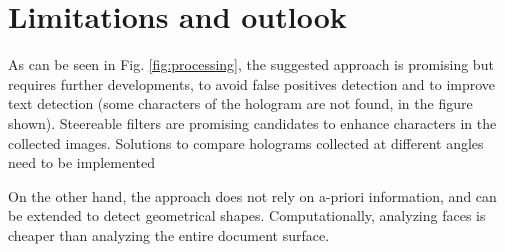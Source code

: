 \documentclass[a4paper]{article}
\begin{document}
\section{Limitations and outlook}

As can be seen in Fig. \ref{fig:processing}, the suggested approach is promising but requires further developments, to avoid false positives detection and to improve text detection (some characters of the hologram are not found, in the figure shown). Steereable filters are promising candidates to enhance characters in the collected images. Solutions to compare holograms collected at different angles need to be implemented

On the other hand, the approach does not rely on a-priori information, and can be extended to detect geometrical shapes. Computationally, analyzing faces is cheaper than analyzing the entire document surface. 
\end{document}
